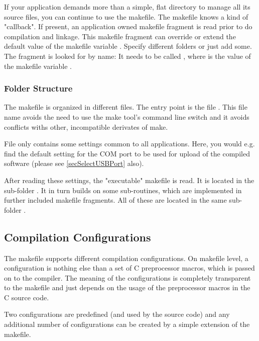 If your application demands more than a simple, flat directory to manage
all its source files, you can continue to use the makefile. The makefile
knows a kind of "callback". If present, an application owned makefile
fragment is read prior to do compilation and linkage. This makefile
fragment can override or extend the default value of the makefile variable
. Specify different folders or just add some. The
fragment is looked for by name: It needs to be called
, where
 is the value of the makefile
variable .

\subsubsection{Folder Structure}

The makefile is organized in different files. The entry point is the file
. This file name avoids the need to use the make tool's
command line switch  and
it avoids conflicts withs other, incompatible derivates of make.

File  only contains some settings common to all \rtos{}
applications. Here, you would e.g. find the default setting for the COM
port to be used for upload of the compiled software (please see
\ref{secSelectUSBPort} also).

After reading these settings, the "executable" makefile
 is read. It is located in the sub-folder
. It in turn builds on some sub-routines, which are
implemented in further included makefile fragments. All of these are
located in the same sub-folder .


\subsection{Compilation Configurations}

The makefile supports different compilation configurations. On makefile
level, a configuration is nothing else than a set of C preprocessor
macros, which is passed on to the compiler. The meaning of the
configurations is completely transparent to the makefile and just depends
on the usage of the preprocessor macros in the C source code.

Two configurations are predefined (and used by the \rtos{} source code)
and any additional number of configurations can be created by a simple
extension of the makefile.

